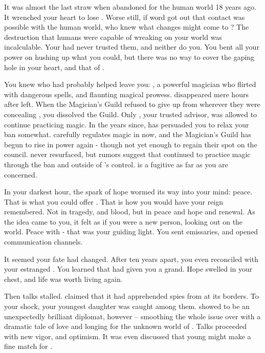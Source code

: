 \documentclass[char]{NeptuneBall}
\begin{document}
It was almost the last straw when \cAriel{\Prince} \cAriel{} abandoned \pAtlantis{} for the human world 18 years ago.  It wrenched your heart to lose \cAriel{\them{}}. Worse still, if word got out that contact was possible with the human world, who knew what changes might come to \pAtlantis{}? The destruction that humans were capable of wreaking on your world was incalculable.  Your \cExKing{\parent} had never trusted them, and neither do you. You bent all your power on hushing up what you could, but there was no way to cover the gaping hole in your heart, and that of \pAtlantis{}. 

You knew who had probably helped \cAriel{} leave you: \cWitch{}, a powerful magician who flirted with dangerous spells, and flaunting \cWitch{\their} magical prowess. \cWitch{\They} disappeared mere hours after \cAriel{} left. When the Magician's Guild refused to give \cWitch{\them} up from wherever they were concealing \cWitch{\them}, you dissolved the Guild. Only \cManta{}, your trusted advisor, was allowed to continue practicing magic. In the years since, \cManta{} has persuaded you to relax your ban somewhat. \cManta{} carefully regulates magic in \pAtlantis{} now, and the Magician's Guild has begun to rise in power again - though not yet enough to regain their spot on the council. \cWitch{} never resurfaced, but rumors suggest that \cWitch{\they} continued to practice magic through the ban and outside of \cManta{}'s control. \cWitch{} is a fugitive as far as you are concerned.

In your darkest hour, the spark of hope wormed its way into your mind: peace. That is what you could offer \pAtlantis{}. That is how you would have your reign remembered. Not in tragedy, and blood, but in peace and hope and renewal.  As the idea came to you, it felt as if you were a new person, looking out on the world. Peace with \pPacifica{} - that was your guiding light. You sent emissaries, and opened communication channels. 

It seemed your fate had changed. After ten years apart, you even reconciled with your estranged \cAriel{\offspring} \cAriel{}.  You learned that \cAriel{} had given you a grand\cWillow{\offspring}. Hope swelled in your chest, and life was worth living again.  

Then talks stalled. \pPacifica{} claimed that it had apprehended spies from \pAtlantis{} at its borders. To your shock, your youngest daughter \cPrincess{} was caught among them. \cPrincess{\They} showed \cPrincess{\themself} to be an unexpectedly brilliant diplomat, however -- smoothing the whole issue over with a dramatic tale of love and longing for the unknown world of \pPacifica{}. Talks proceeded with new vigor, and optimism. It was even discussed that young \cPrince{\prince} \cPrince{} might make a fine match for \cPrincess{}.
\end{document}
